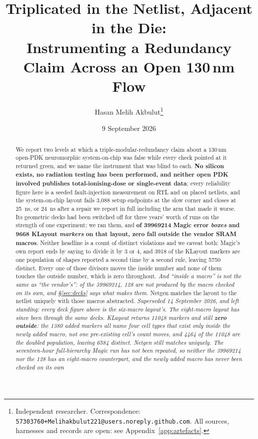 \documentclass[11pt,a4paper]{article}
\title{Triplicated in the Netlist, Adjacent in the Die:\\
Instrumenting a Redundancy Claim Across an Open 130\,nm Flow}
\author{Hasan Melih Akbulut\thanks{Independent researcher.
Correspondence: \texttt{57303760+Melihakbulut221@users.noreply.github.com}.
All sources, harnesses and records are open: see Appendix~\ref{app:artefacts}.}}
\date{9 September 2026}
\begin{document}
\maketitle

\begin{abstract}
We report two levels at which a triple-modular-redundancy claim about a
130\,nm open-PDK neuromorphic system-on-chip was false while every check
pointed at it returned green, and we name the instrument that was blind
to each.
\textbf{No silicon exists, no radiation testing has been performed, and
neither open PDK involved publishes total-ionising-dose or single-event
data}; every reliability figure here is a seeded fault-injection
measurement on RTL and on placed netlists, and the system-on-chip layout
fails 3{,}088 setup endpoints at the slow corner and closes at
\SI{25}{\nano\second}, or \SI{24}{\nano\second} after a repair we report
in full including the arm that made it worse. Its geometric decks had been switched off for
three years' worth of runs on the strength of one experiment; we ran
them, and \textbf{of \num{39969214} Magic error \emph{boxes} and
\num{9668} KLayout \emph{markers} on that layout, zero fall outside the
vendor SRAM macros}. Neither headline is a count of distinct violations and we
caveat both: Magic's own report ends by saying to divide it by 3 or 4,
and \num{3918} of the KLayout markers are one population of shapes
reported a second time by a second rule, leaving \num{5750} distinct.
Every one of those divisors moves the inside number and none of them
touches the outside number, which is zero throughout. \emph{And ``inside
a macro'' is not the same as ``the vendor's'': of the \num{39969214},
\num{128} are not produced by the macro checked on its own, and
\S\ref{sec:decks} says what makes them.} Netgen matches the layout to
the netlist uniquely with those macros abstracted.
\emph{Superseded 14 September 2026, and left standing: every deck figure
above is the six-macro layout's. The eight-macro layout has since been
through the same decks. KLayout returns \num{11048} markers and still
\textbf{zero outside}: the \num{1380} added markers all name four cell
types that exist only inside the newly added macro, not one pre-existing
cell's count moves, and \num{4464} of the \num{11048} are the doubled
population, leaving \num{6584} distinct. Netgen still matches uniquely.
The seventeen-hour full-hierarchy Magic run has not been repeated, so
neither the \num{39969214} nor the \num{128} has an eight-macro
counterpart, and the newly added macro has never been checked on its own
}
\end{abstract}
\end{document}
